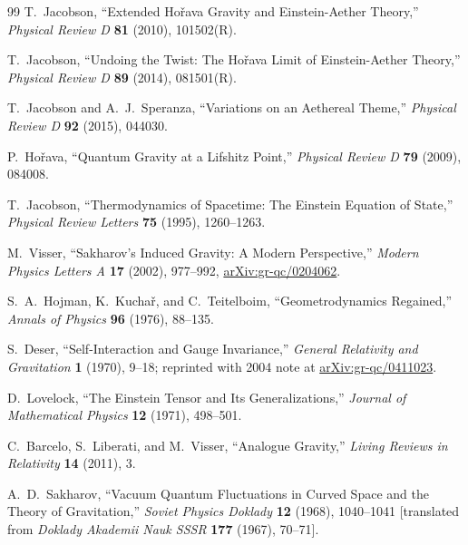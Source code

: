 \begin{thebibliography}{99}
T.~Jacobson,
``Extended Ho\v{r}ava Gravity and Einstein-Aether Theory,''
\emph{Physical Review D} \textbf{81} (2010), 101502(R).

T.~Jacobson,
``Undoing the Twist: The Ho\v{r}ava Limit of Einstein-Aether Theory,''
\emph{Physical Review D} \textbf{89} (2014), 081501(R).

T.~Jacobson and A.~J.~Speranza,
``Variations on an Aethereal Theme,''
\emph{Physical Review D} \textbf{92} (2015), 044030.

P.~Ho\v{r}ava,
``Quantum Gravity at a Lifshitz Point,''
\emph{Physical Review D} \textbf{79} (2009), 084008.

T.~Jacobson,
``Thermodynamics of Spacetime: The Einstein Equation of State,''
\emph{Physical Review Letters} \textbf{75} (1995), 1260--1263.

M.~Visser,
``Sakharov's Induced Gravity: A Modern Perspective,''
\emph{Modern Physics Letters A} \textbf{17} (2002), 977--992,
\href{https://arxiv.org/abs/gr-qc/0204062}{arXiv:gr-qc/0204062}.

S.~A.~Hojman, K.~Kucha\v{r}, and C.~Teitelboim,
``Geometrodynamics Regained,''
\emph{Annals of Physics} \textbf{96} (1976), 88--135.

S.~Deser,
``Self-Interaction and Gauge Invariance,''
\emph{General Relativity and Gravitation} \textbf{1} (1970), 9--18;
reprinted with 2004 note at
\href{https://arxiv.org/abs/gr-qc/0411023}{arXiv:gr-qc/0411023}.

D.~Lovelock,
``The Einstein Tensor and Its Generalizations,''
\emph{Journal of Mathematical Physics} \textbf{12} (1971), 498--501.

C.~Barcelo, S.~Liberati, and M.~Visser,
``Analogue Gravity,''
\emph{Living Reviews in Relativity} \textbf{14} (2011), 3.

A.~D.~Sakharov,
``Vacuum Quantum Fluctuations in Curved Space and the Theory of Gravitation,''
\emph{Soviet Physics Doklady} \textbf{12} (1968), 1040--1041
[translated from \emph{Doklady Akademii Nauk SSSR} \textbf{177} (1967), 70--71].

\end{thebibliography}
